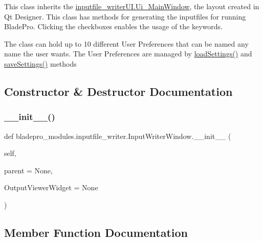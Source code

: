 This class inherits the \hyperlink{a00074}{inputfile\+\_\+writer\+U\+I.\+Ui\+\_\+\+Main\+Window}, the layout created in Qt Designer. This class has methods for generating the inputfiles for running Blade\+Pro. Clicking the checkboxes enables the usage of the keywords.

The class can hold up to 10 different User Preferences that can be named any name the user wants. The User Preferences are managed by \hyperlink{a00070_a0c4f30850537553db0ff2e27059733a4}{load\+Settings()} and \hyperlink{a00070_a723573fade09f206a9c89569885558c1}{save\+Settings()} methods 

\subsection{Constructor \& Destructor Documentation}
\hypertarget{a00070_a8b9718669dac6016ebe4e4f27421c7f2}{}\label{a00070_a8b9718669dac6016ebe4e4f27421c7f2} 
\subsubsection{\texorpdfstring{\+\_\+\+\_\+init\+\_\+\+\_\+()}{\_\_init\_\_()}}
{\footnotesize\ttfamily def bladepro\+\_\+modules.\+inputfile\+\_\+writer.\+Input\+Writer\+Window.\+\_\+\+\_\+init\+\_\+\+\_\+ (\begin{DoxyParamCaption}\item[{}]{self,  }\item[{}]{parent = {\ttfamily None},  }\item[{}]{Output\+Viewer\+Widget = {\ttfamily None} }\end{DoxyParamCaption})}



\subsection{Member Function Documentation}
\hypertarget{a00070_abf54bdb00a2743fb488463ab7247b146}{}\label{a00070_abf54bdb00a2743fb488463ab7247b146} 

